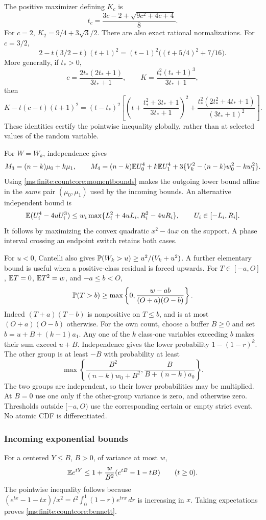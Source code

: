 The positive maximizer defining \(K_c\) is
\[
 t_c=\frac{3c-2+\sqrt{9c^2+4c+4}}8.
\]
For \(c=2\), \(K_2=9/4+3\sqrt3/2\). There are also exact rational
normalizations. For \(c=3/2\),
\[
 2-t(3/2-t)(t+1)^2
 =(t-1)^2\bigl((t+5/4)^2+7/16\bigr).
\]
More generally, if \(t_*>0\),
\[
 c=\frac{2t_*(2t_*+1)}{3t_*+1},\qquad
 K=\frac{t_*^2(t_*+1)^3}{3t_*+1},
\]
then
\[
 K-t(c-t)(t+1)^2=(t-t_*)^2
 \left[\left(t+\frac{t_*^2+3t_*+1}{3t_*+1}\right)^2
       +\frac{t_*^2(2t_*^2+4t_*+1)}{(3t_*+1)^2}\right].
\]
These identities certify the pointwise inequality globally, rather than at
selected values of the random variable.

For \(W=W_k\), independence gives
\[
 M_3=(n-k)\mu_0+k\mu_1,\qquad
 M_4=(n-k)\mathbb E U_0^4+k\mathbb E U_1^4
       +3\{V_k^2-(n-k)w_0^2-kw_1^2\}.
\]
Using \eqref{ms:finite:countcore:momentbounds} makes the outgoing lower bound
affine in the \emph{same} pair \((\mu_0,\mu_1)\) used by the
incoming bounds. An alternative independent bound is
\[
 \mathbb E(U_i^4-4uU_i^3)
 \le w_i\max\{L_i^2+4uL_i,R_i^2-4uR_i\},
 \qquad U_i\in[-L_i,R_i].
\]
It follows by maximizing the convex quadratic \(x^2-4ux\) on the
support. A phase interval crossing an endpoint switch retains both cases.

For \(u<0\), Cantelli also gives
\(\mathbb P(W_k>u)\ge u^2/(V_k+u^2)\). A further elementary bound is
useful when a positive-class residual is forced upwards. For
\(T\in[-a,O]\), \(\mathbb E T=0\), \(\mathbb E T^2=w\), and \(-a\le b<O\),
\[
 \mathbb P(T>b)\ge\max\left\{0,
             \frac{w-ab}{(O+a)(O-b)}\right\}.
\]
Indeed \((T+a)(T-b)\) is nonpositive on \(T\le b\), and is at
most \((O+a)(O-b)\) otherwise. For the own count, choose a buffer
\(B\ge0\) and set \(b=u+B+(k-1)a_1\). Any one of the \(k\)
class-one variables exceeding \(b\) makes their sum exceed \(u+B\).
Independence gives the lower probability \(1-(1-r)^k\). The other
group is at least \(-B\) with probability at least
\[
 \max\left\{\frac{B^2}{(n-k)w_0+B^2},
             \frac{B}{B+(n-k)a_0}\right\}.
\]
The two groups are independent, so their lower probabilities may be
multiplied. At \(B=0\) use one only if the other-group variance is
zero, and otherwise zero. Thresholds outside \([-a,O)\) use the
corresponding certain or empty strict event. No atomic CDF is differentiated.

\subsubsection{Incoming exponential bounds}

For a centered \(Y\le B\), \(B>0\), of variance at most \(w\),
\begin{equation}
 \mathbb E e^{tY}\le1+\frac w{B^2}(e^{tB}-1-tB)
 \qquad(t\ge0).
 \label{ms:finite:countcore:bennett}
\end{equation}
The pointwise inequality follows because
\((e^{tx}-1-tx)/x^2=t^2\int_0^1(1-r)e^{trx}\,dr\) is increasing
in \(x\). Taking expectations proves \eqref{ms:finite:countcore:bennett}.

